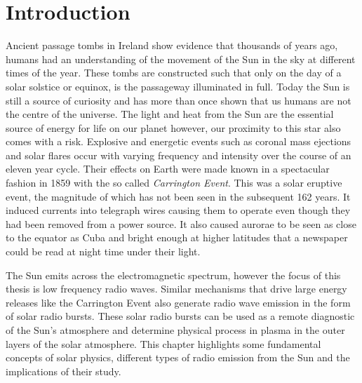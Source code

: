 \doublespacing
\chapter{Introduction}
\label{chap:intro}
Ancient passage tombs in Ireland show evidence that thousands of years ago, humans had an understanding of the movement of the Sun in the sky at different times of the year. These tombs are constructed such that only on the day of a solar solstice or equinox, is the passageway illuminated in full. Today the Sun is still a source of curiosity and has more than once shown that us humans are not the centre of the universe. The light and heat from the Sun are the essential source of energy for life on our planet however, our proximity to this star also comes with a risk. Explosive and energetic events such as coronal mass ejections and solar flares occur with varying frequency and intensity over the course of an eleven year cycle. Their effects on Earth were made known in a spectacular fashion in 1859 with the so called \textit{Carrington Event}. This was a solar eruptive event, the magnitude of which has not been seen in the subsequent 162 years. It induced currents into telegraph wires causing them to operate even though they had been removed from a power source. It also caused aurorae to be seen as close to the equator as Cuba and bright enough at higher latitudes that a newspaper could be read at night time under their light. 

The Sun emits across the electromagnetic spectrum, however the focus of this thesis is low frequency radio waves. Similar mechanisms that drive large energy releases like the Carrington Event also generate radio wave emission in the form of solar radio bursts. These solar radio bursts can be used as a remote diagnostic of the Sun's atmosphere and determine physical process in plasma in the outer layers of the solar atmosphere.
This chapter highlights some fundamental concepts of solar physics, different types of radio emission from the Sun and the implications of their study.

